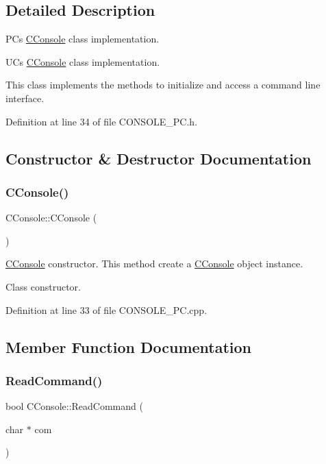 \subsection{Detailed Description}
PC\textquotesingle{}s \mbox{\hyperlink{class_c_console}{C\+Console}} class implementation. 

UC\textquotesingle{}s \mbox{\hyperlink{class_c_console}{C\+Console}} class implementation.

This class implements the methods to initialize and access a command line interface. 

Definition at line 34 of file C\+O\+N\+S\+O\+L\+E\+\_\+\+P\+C.\+h.



\subsection{Constructor \& Destructor Documentation}
\mbox{\label{class_c_console_a9ff3a14fd32fec13a98fd6064d26c861}} 
\subsubsection{\texorpdfstring{C\+Console()}{CConsole()}}
{\footnotesize\ttfamily C\+Console\+::\+C\+Console (\begin{DoxyParamCaption}{ }\end{DoxyParamCaption})}



\mbox{\hyperlink{class_c_console}{C\+Console}} constructor. This method create a \mbox{\hyperlink{class_c_console}{C\+Console}} object instance. 

Class constructor. 

Definition at line 33 of file C\+O\+N\+S\+O\+L\+E\+\_\+\+P\+C.\+cpp.



\subsection{Member Function Documentation}
\mbox{\label{class_c_console_a93d2d9f396de1137b6aefe87643ff7fe}} 
\subsubsection{\texorpdfstring{Read\+Command()}{ReadCommand()}}
{\footnotesize\ttfamily bool C\+Console\+::\+Read\+Command (\begin{DoxyParamCaption}\item[{char $\ast$}]{com }\end{DoxyParamCaption})\hspace{0.3cm}{\ttfamily [virtual]}}


